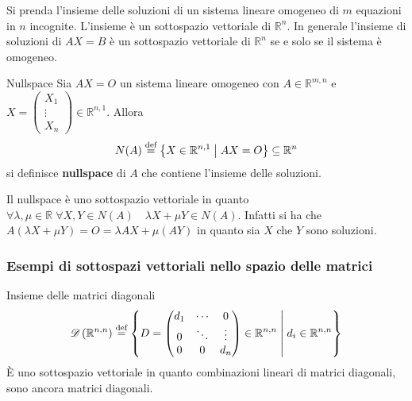Si prenda l'insieme delle soluzioni di un sistema lineare omogeneo di $m$ equazioni in
$n$ incognite. L'insieme è un sottospazio vettoriale di $\mathbb{R}^n$. In generale
l'insieme di soluzioni di $AX=B$ è un sottospazio vettoriale di $\mathbb{R}^n$ se e solo
se il sistema è omogeneo.

\begin{Def}{Nullspace}
  Sia $AX=O$ un sistema lineare omogeneo con $A\in\mathbb{R}^{m,n}$ e
  $X=
  \begin{pmatrix}
    X_1\\\vdots\\X_n
  \end{pmatrix}\in\mathbb{R}^{n,1}$. Allora
  \begin{equation*}
    N(A)\bydef \left\{ X\in\mathbb{R}^{n,1}\Setsuchthat AX = O
    \right\}\subseteq\mathbb{R}^n
  \end{equation*}
  si definisce \textbf{nullspace} di $A$ che contiene l'insieme delle soluzioni.
\end{Def}

Il nullspace è uno sottospazio vettoriale in quanto
$\forall\lambda,\mu\in\mathbb{R}\;\forall X,Y\in N(A)\quad \lambda X+\mu Y\in N(A)$.
Infatti si ha che $A(\lambda X+\mu Y) = O = \lambda AX+\mu (AY)$ in quanto sia $X$ che
$Y$ sono soluzioni.

\subsubsection{Esempi di sottospazi vettoriali nello spazio delle matrici}%
\label{sub:esempi_di_sottospazi_vettoriali_nello_spazio_dell_matrici}

\begin{Def}{Insieme delle matrici diagonali}
  \begin{equation*}
    \mathscr{D}\left( \mathbb{R}^{n,n} \right) \bydef \left\{ D =
      \begin{pmatrix}
        d_1 & \cdots & 0\\
        0 & \ddots & \vdots\\
        0 & 0 & d_n
      \end{pmatrix}\in\mathbb{R}^{n,n}
      \Setsuchthat d_i\in\mathbb{R}^{n,n}
    \right\}
  \end{equation*}
  È uno sottospazio vettoriale in quanto combinazioni lineari di matrici diagonali, sono
  ancora matrici diagonali.
\end{Def}

